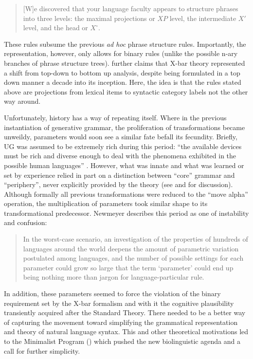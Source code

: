 \documentclass[output=paper]{langscibook}
\begin{document}
\begin{quote}
[W]e discovered that your language faculty appears to structure phrases into three levels: the maximal projections or $XP$ level, the intermediate $X'$ level, and the head or $X^{\circ}$. \citep[50]{Poole2002}
\end{quote}

These rules subsume the previous \textit{ad hoc} phrase structure rules. Importantly, the representation, however, only allows for binary rules (unlike the possible n-ary branches of phrase structure trees). \cite{Freidin2012} further claims that X-bar theory represented a shift from top-down to bottom up analysis, despite being formulated in a top down manner a decade into its inception. Here, the idea is that the rules stated above are projections from lexical items to syntactic category labels not the other way around. 

Unfortunately, history has a way of repeating itself. Where in the previous instantiation of generative grammar, the proliferation of transformations became unweildy, parameters would soon see a similar fate befall its fecundity. Briefly, UG was assumed to be extremely rich during this period: ``the available devices must be rich and diverse enough to deal with the phenomena exhibited in the possible human languages'' \citep[55]{Chomsky1986}. However, what was innate and what was learned or set by experience relied in part on a distinction between ``core'' grammar and ``periphery'', never explicitly provided by the theory (see \citealt{Pullum1983} and \citealt{Culicover2011} for discussion). Although formally all previous transformations were reduced to the ``move alpha'' operation, the multiplication of parameters took similar shape to its transformational predecessor. Newmeyer describes this period as one of instability and confusion:

\begin{quote}
In the worst-case scenario, an investigation of the properties of hundreds of languages around the world deepens the amount of parametric variation postulated among languages, and the number of possible settings for each parameter could grow so large that the term \textquoteleft{}parameter' could end up being nothing more than jargon for language-particular rule. \citep[64]{Newmeyer1996}
\end{quote}

In addition, these parameters seemed to force the violation of the binary requirement set by the X-bar formalism and with it the cognitive plausibility transiently acquired after the Standard Theory. There needed to be a better way of capturing the movement toward simplifying the grammatical representation and theory of natural language syntax. This and other theoretical motivations led to the Minimalist Program (\citeyear{Chomsky1995MP}) which pushed the new biolinguistic agenda and a call for further simplicity. 
\end{document}
